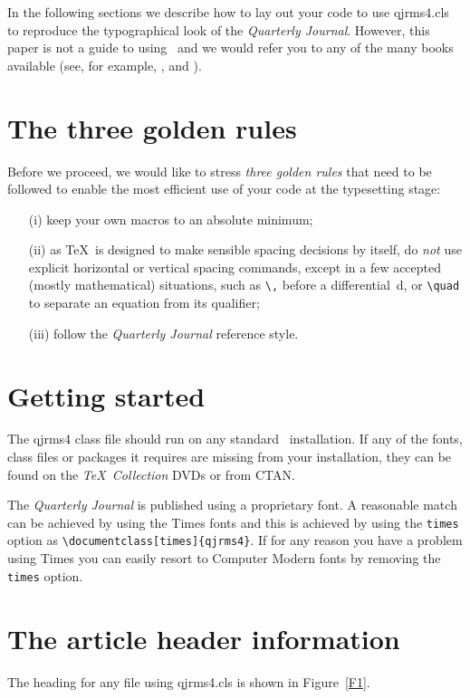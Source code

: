 \documentclass[times]{qjrms4}
\begin{document}
In the following sections we describe how to lay out your code to
use \textsf{qjrms4.cls} to reproduce the typographical look of the
\emph{Quarterly Journal}. However, this paper is not a guide to
using \LaTeXe\ and we would refer you to any of the many books
available (see, for example, \cite{R1}, \cite{R2} and \cite{R3}).

\section{The three golden rules} Before we proceed, we would like to
stress \emph{three golden rules} that need to be followed to
enable the most efficient use of your code at the typesetting
stage:
\begin{enumerate}
\item[(i)] keep your own macros to an absolute minimum;
\item[(ii)] as \TeX\ is designed to make sensible spacing
decisions by itself, do \emph{not} use explicit horizontal or
vertical spacing commands, except in a few accepted (mostly
mathematical) situations, such as \verb"\," before a
differential~d, or \verb"\quad" to separate an equation from its
qualifier;
\item[(iii)] follow the \emph{Quarterly Journal}
reference style.
\end{enumerate}

\section{Getting started} The \textsf{qjrms4} class file should run
on any standard \LaTeXe\ installation. If any of the fonts, class
files or packages it requires are missing from your installation,
they can be found on the \emph{\TeX\ Collection} DVDs or from
CTAN.

The \emph{Quarterly Journal} is published using a proprietary
font. A reasonable match can be achieved by using the Times fonts
and this is achieved by using the \verb"times" option as
\verb"\documentclass[times]{qjrms4}". If for any reason you have a
problem using Times you can easily resort to Computer Modern fonts
by removing the \verb"times" option.

\section{The article header information}
The heading for any file using \textsf{qjrms4.cls} is shown in
Figure~\ref{F1}.
\end{document}
